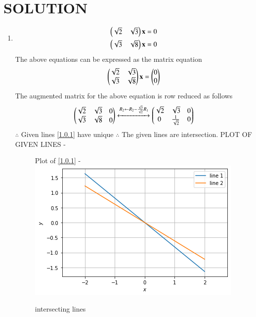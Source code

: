 \documentclass[journal,12pt,twocolumn]{IEEEtran}
\begin{document}
\section{SOLUTION}  
\begin{enumerate}
\item
\begin{align}
\begin{split}
\begin{pmatrix}\sqrt{2}& \sqrt{3} \end{pmatrix}\mathbf{x}&=0
\\
\begin{pmatrix}\sqrt{3}& \sqrt{8} \end{pmatrix}\mathbf{x}&=0
\end{split}
\end{align}
The above equations can be expressed as the matrix equation
\begin{align}
\begin{pmatrix}\sqrt{2} & \sqrt {3}\\\sqrt{3} & \sqrt{8}\end{pmatrix} \mathbf{x} = \begin{pmatrix}0\\0\end{pmatrix}
\end{align}
%
The augmented matrix for the above equation is row reduced as follows
\begin{align}
\begin{pmatrix}\sqrt{2} & \sqrt{3}& 0\\\sqrt {3}& \sqrt{8}& 0\end{pmatrix} 
\xleftrightarrow {R_2\leftarrow R_2-\frac{\sqrt{3}}{\sqrt{2}}R_1}\begin{pmatrix}\sqrt{2}& \sqrt{3}& 0\\0 & \frac{1}{\sqrt{2}}& 0\end{pmatrix}
\\ 
\end{align}
$\therefore$ Given lines \eqref{1.0.1} have unique 
$\therefore$ The given lines are intersection.
PLOT OF GIVEN LINES -
\begin{figure}[ht!]
Plot of \eqref{1.0.1} -
    \centering
    \includegraphics[width=\columnwidth]{figure2(1).png}
    \caption{intersecting lines}
    \label{fig:intersecting lines.}

\end{figure}
\end{enumerate}
\end{document}
